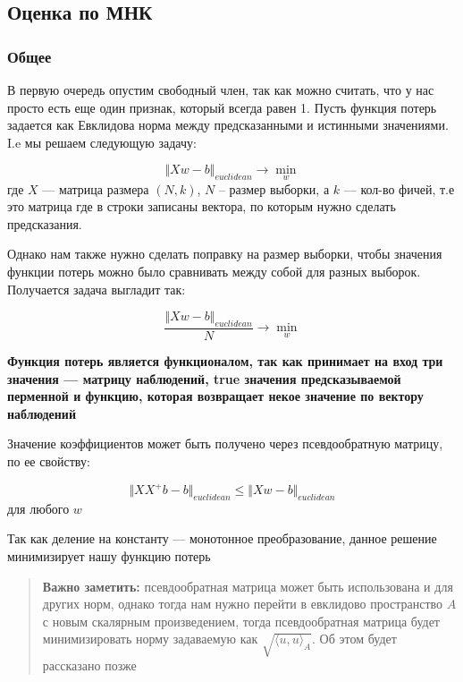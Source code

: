 \documentclass{article}
\begin{document}
    \subsection{Оценка по МНК}

    \subsubsection{Общее}

    В первую очередь опустим свободный член, так как можно считать, что у нас просто есть еще один признак, который всегда равен 1.
    Пусть функция потерь задается как Евклидова норма между предсказанными и истинными значениями.
    I.e мы решаем следующую задачу:

    \begin{equation}
        \Vert Xw - b \Vert_{euclidean} \rightarrow \min_{w}
    \end{equation}
    где $X$ --- матрица размера $(N, k)$, $N$ -- размер выборки, а $k$ --- кол-во фичей, т.е это матрица где в строки записаны вектора,
    по которым нужно сделать предсказания.

    Однако нам также нужно сделать поправку на размер выборки, чтобы значения функции потерь можно было сравнивать между собой для разных выборок.
    Получается задача выгладит так:

     \begin{equation}
        \frac{\Vert Xw - b \Vert_{euclidean}}{N} \rightarrow \min_{w}
     \end{equation}
    
    \textbf{Функция потерь является функционалом, так как принимает на вход три значения --- матрицу наблюдений, true значения предсказываемой перменной и функцию, которая возвращает некое значение по вектору наблюдений}

    Значение коэффициентов может быть получено через псевдообратную матрицу, по ее свойству:

    \begin{equation}
        \Vert X X^{+} b - b \Vert_{euclidean} \leq \Vert X w - b \Vert_{euclidean}
    \end{equation}
    для любого $w$

    \quad

    Так как деление на константу --- монотонное преобразование, данное решение минимизирует нашу функцию потерь

    \begin{quote}
        \textbf{Важно заметить:} псевдообратная матрица может быть использована и для других норм, однако тогда нам
        нужно перейти в евклидово пространство $A$ с новым скалярным произведением, тогда псевдообратная матрица будет минимизировать
        норму задаваемую как $\sqrt{\langle u, u \rangle_{A}}$.
        Об этом будет рассказано позже
    \end{quote}
\end{document}
